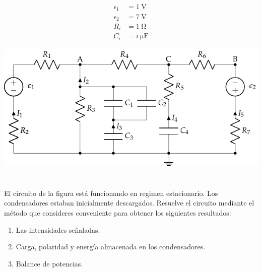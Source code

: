\documentclass[10pt]{article}
\begin{document}
\begin{minipage}[c]{0.3\linewidth}
  \begin{align*}
    \epsilon_1&=\SI{1}{\volt}\\
    \epsilon_2&=\SI{7}{\volt}\\
    R_i &= \SI{1}{\ohm}\\
    C_i &= \SI{i}{\micro\farad}
  \end{align*}
\end{minipage}
\begin{minipage}[c]{0.7\linewidth}
  \includegraphics{figs/mallas_agrupacion_condensadores.pdf}
\end{minipage}

\clearpage

\section{}

El circuito de la figura está funcionando en regimen estacionario. Los condensadores estaban inicialmente descargados. Resuelve el circuito mediante el método que consideres conveniente para obtener los siguientes resultados:

\begin{enumerate}
\item Las intensidades señaladas.
\item Carga, polaridad y energía almacenada en los condensadores.
\item Balance de potencias.
\end{enumerate}
\end{document}
